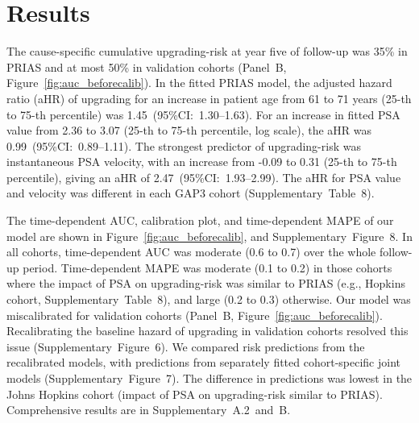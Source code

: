 \section{Results}
The cause-specific cumulative upgrading-risk at year five of follow-up was 35\% in PRIAS and at most 50\% in validation cohorts (Panel~B, Figure~\ref{fig:auc_beforecalib}). In the fitted PRIAS model, the adjusted hazard ratio (aHR) of upgrading for an increase in patient age from 61 to 71 years (25-th to 75-th percentile) was 1.45~(95\%CI:~1.30--1.63). For an increase in fitted PSA value from 2.36 to 3.07 (25-th to 75-th percentile, log scale), the aHR was 0.99~(95\%CI:~0.89--1.11). The strongest predictor of upgrading-risk was instantaneous PSA velocity, with an increase from -0.09 to 0.31 (25-th to 75-th percentile), giving an aHR of 2.47~(95\%CI:~1.93--2.99). The aHR for PSA value and velocity was different in each GAP3 cohort (Supplementary~Table~8).

The time-dependent AUC, calibration plot, and time-dependent MAPE of our model are shown in Figure~\ref{fig:auc_beforecalib}, and Supplementary~Figure~8. In all cohorts, time-dependent AUC was moderate (0.6 to 0.7) over the whole follow-up period. Time-dependent MAPE was moderate (0.1 to 0.2) in those cohorts where the impact of PSA on upgrading-risk was similar to PRIAS (e.g., Hopkins cohort, Supplementary~Table~8), and large (0.2 to 0.3) otherwise. Our model was miscalibrated for validation cohorts (Panel~B, Figure~\ref{fig:auc_beforecalib}). Recalibrating the baseline hazard of upgrading in validation cohorts resolved this issue (Supplementary~Figure~6). We compared risk predictions from the recalibrated models, with predictions from separately fitted cohort-specific joint models (Supplementary~Figure~7). The difference in predictions was lowest in the Johns Hopkins cohort (impact of PSA on upgrading-risk similar to PRIAS). Comprehensive results are in Supplementary~A.2~and~B.

